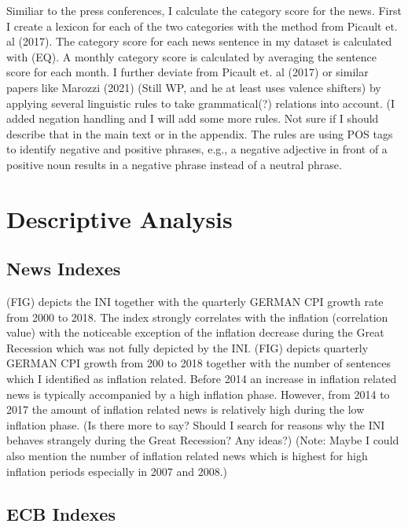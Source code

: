 \documentclass[review]{elsarticle}
\begin{document}
Similiar to the press conferences, I calculate the category score for the news. First I create a lexicon for each of the two categories with the method from Picault et. al (2017). The category score for each news sentence in my dataset is calculated with (EQ). A monthly category score is calculated by averaging the sentence score for each month.
I further deviate from Picault et. al (2017) or similar papers like Marozzi (2021) (Still WP, and he at least uses valence shifters) by applying several linguistic rules to take grammatical(?) relations into account.
(I added negation handling and I will add some more rules. Not sure if I should describe that in the main text or in the appendix. The rules are using POS tags to identify negative and positive phrases, e.g., a negative adjective in front of a positive noun results in a negative phrase instead of a neutral phrase.

\section{Descriptive Analysis} \label{sec:Descriptive Analysis}

\subsection{News Indexes}\label{sec:News Indexes}

(FIG) depicts the INI together with the quarterly GERMAN CPI growth rate from 2000 to 2018. The index strongly correlates with the inflation (correlation value) with the noticeable exception of the inflation decrease during the Great Recession which was not fully depicted by the INI.
(FIG) depicts quarterly GERMAN CPI growth from 200 to 2018 together with the number of sentences which I identified as inflation related. Before 2014 an increase in inflation related news is typically accompanied by a high inflation phase. However, from 2014 to 2017 the amount of inflation related news is relatively high during the low inflation phase. 
(Is there more to say? Should I search for reasons why the INI behaves strangely during the Great Recession? Any ideas?)
(Note: Maybe I could also mention the number of inflation related news which is highest for high inflation periods especially in 2007 and 2008.)

\subsection{ECB Indexes}\label{sec:ECB Indexes}
\end{document}
